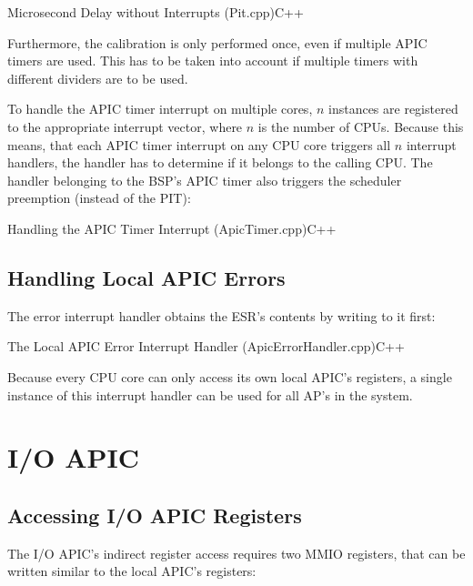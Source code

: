 \begin{codeblock}{Microsecond Delay without Interrupts (Pit.cpp)}{C++}
\end{codeblock}

Furthermore, the calibration is only performed once, even if multiple APIC timers are used.
This has to be taken into account if multiple timers with different dividers are to be used.

To handle the APIC timer interrupt on multiple cores, \(n\)  instances are registered to the appropriate interrupt vector, where \(n\) is the number of CPUs.
Because this means, that each APIC timer interrupt on any CPU core triggers all \(n\) interrupt handlers, the handler has to determine if it belongs to the calling CPU\@.
The handler belonging to the BSP's APIC timer also triggers the scheduler preemption (instead of the PIT):

\begin{codeblock}{Handling the APIC Timer Interrupt (ApicTimer.cpp)}{C++}
\end{codeblock}

\subsection{Handling Local APIC Errors}
\label{subsec:apxhandlingerror}

The error interrupt handler obtains the ESR's contents by writing to it first:

\begin{codeblock}{The Local APIC Error Interrupt Handler (ApicErrorHandler.cpp)}{C++}
\end{codeblock}

Because every CPU core can only access its own local APIC's registers, a single instance of this interrupt handler can be used for all AP's in the system.

\section{I/O APIC}
\label{sec:apxioapic}

\subsection{Accessing I/O APIC Registers}
\label{subsec:iolistings}

The I/O APIC's indirect register access requires two MMIO registers, that can be written similar to the local APIC's registers:

